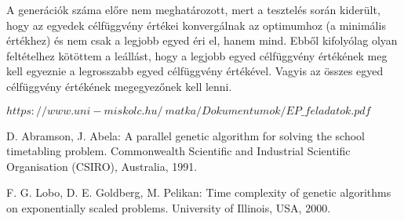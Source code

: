 \documentclass[a4paper,12pt]{article}
\begin{document}
A generációk száma előre nem meghatározott, mert a tesztelés során kiderült, hogy az egyedek célfüggvény értékei konvergálnak az optimumhoz (a minimális értékhez) és nem csak a legjobb egyed éri el, hanem mind. Ebből kifolyólag olyan feltételhez kötöttem a leállást, hogy a legjobb egyed célfüggvény értékének meg kell egyeznie a legrosszabb egyed célfüggvény értékével. Vagyis az összes egyed célfüggvény értékének megegyezőnek kell lenni.



\noindent [1]\quad $https://www.uni-miskolc.hu/~matka/Dokumentumok/EP\_feladatok.pdf$
 
\noindent [2]\quad D. Abramson, J. Abela: A parallel genetic algorithm for solving the school timetabling problem.
Commonwealth Scientific and Industrial Scientific Organisation (CSIRO), Australia, 1991.

\noindent [3]\quad F. G. Lobo, D. E. Goldberg, M. Pelikan: Time complexity of genetic algorithms on exponentially scaled problems.
University of Illinois, USA, 2000. 
\end{document}
